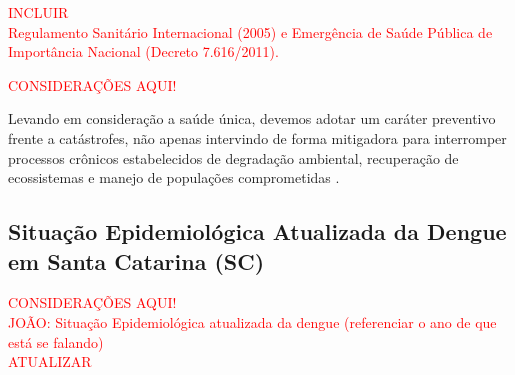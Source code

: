 \textcolor{red}{INCLUIR\\Regulamento Sanitário Internacional (2005) e Emergência de Saúde Pública de
Importância Nacional (Decreto 7.616/2011).}

\begin{center}
\textcolor{red}{CONSIDERAÇÕES AQUI!}\\ 
\end{center}

\indent Levando em consideração a saúde única, devemos adotar um caráter preventivo frente a catástrofes, não apenas  intervindo de forma mitigadora para interromper processos crônicos estabelecidos de degradação ambiental, recuperação de ecossistemas e manejo de populações comprometidas \cite{Cubas2014Tratado}.

\subsection{Situação Epidemiológica Atualizada da Dengue em Santa Catarina (SC)}


\begin{center}
\textcolor{red}{CONSIDERAÇÕES AQUI!}\\
\indent \textcolor{red}{JOÃO: Situação Epidemiológica atualizada da dengue (referenciar o ano de que está se falando)\\ATUALIZAR}\\
\end{center}

